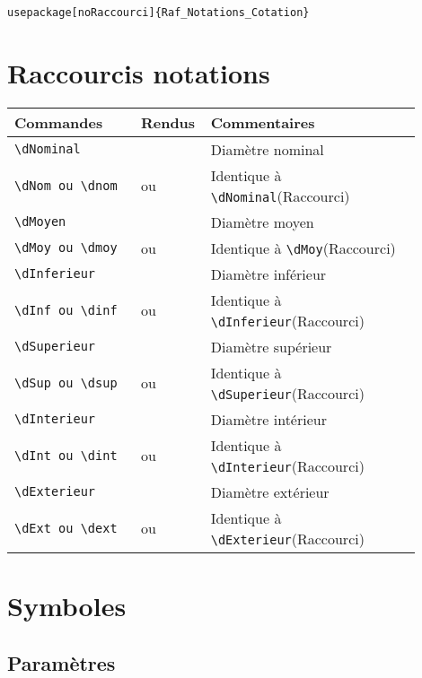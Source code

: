 \documentclass[a4paper,12pt]{article}
\newcommand{\rac}{({\color{red}Raccourci})}
\begin{document}
		\begin{verbatim}
usepackage[noRaccourci]{Raf_Notations_Cotation}
		\end{verbatim}


	\section{Raccourcis notations}
		\noindent
		\begin{tabular}{|p{0.3\linewidth}|p{0.1\linewidth}|p{0.5\linewidth}|}
			\hline
				\textbf{Commandes}&\textbf{Rendus}&\textbf{Commentaires}
			\\\hline\hline
				\verb!\dNominal!			&	\dNominal	&	Diamètre nominal
			\\\hline
				\verb!\dNom ou \dnom!			&	\dNom ou \dnom	&	Identique à \verb!\dNominal!\rac
			\\\hline
				\verb!\dMoyen!				&	\dMoyen		&	Diamètre moyen
			\\\hline
				\verb!\dMoy ou \dmoy!			&	\dMoy ou \dmoy	&	Identique à \verb!\dMoy!\rac
			\\\hline
				\verb!\dInferieur!			&	\dInferieur	&	Diamètre inférieur
			\\\hline
				\verb!\dInf ou \dinf!			&	\dInf ou \dinf	&	Identique à \verb!\dInferieur!\rac
			\\\hline
				\verb!\dSuperieur!			&	\dSuperieur	&	Diamètre supérieur
			\\\hline
				\verb!\dSup ou \dsup!			&	\dSup ou \dsup	&	Identique à \verb!\dSuperieur!\rac
			\\\hline
				\verb!\dInterieur!			&	\dInterieur	&	Diamètre intérieur
			\\\hline
				\verb!\dInt ou \dint!			&	\dInt ou \dint	&	Identique à \verb!\dInterieur!\rac
			\\\hline
				\verb!\dExterieur!			&	\dExterieur	&	Diamètre extérieur
			\\\hline
				\verb!\dExt ou \dext!			&	\dExt ou \dext	&	Identique à \verb!\dExterieur!\rac
			\\\hline
		\end{tabular}

	\section{Symboles}

		\subsection{Paramètres}
\end{document}
